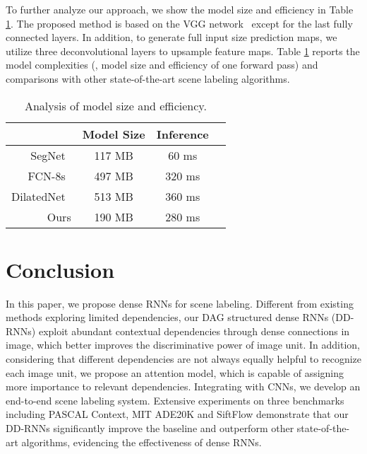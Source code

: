 \documentclass[10pt,twocolumn,letterpaper]{article}
\begin{document}
To further analyze our approach, we show the model size and efficiency in Table \ref{tab:tab5}. The proposed method is based on the VGG network~\cite{simonyan2014very} except for the last fully connected layers. In addition, to generate full input size prediction maps, we utilize three deconvolutional layers to upsample feature maps. Table \ref{tab:tab5} reports the model complexities (\ie, model size and efficiency of one forward pass) and comparisons with other state-of-the-art scene labeling algorithms.

\renewcommand\arraystretch{1}
\begin{table}[htbp]\small
  \centering
  \caption{Analysis of model size and efficiency.}
    \begin{tabular}{rccc}
    \hline
            & \multicolumn{1}{l}{Model Size}  & \multicolumn{1}{l}{Inference} \\
    \hline
    \hline
    SegNet~\cite{badrinarayanan2015segnet}  &    117 MB               &  60 ms\\
    FCN-8s~\cite{long2015fully}  &    497 MB                  &  320 ms\\
    DilatedNet~\cite{yu2015multi} &      513 MB                 &  360 ms\\
    \hline
    \hline
    Ours                           &     190 MB                 & 280 ms \\
    \hline
    \end{tabular}%
  \label{tab:tab5}%
\end{table}%

\section{Conclusion}
\label{sec_con}

In this paper, we propose dense RNNs for scene labeling. Different from existing methods exploring limited dependencies, our DAG structured dense RNNs (DD-RNNs) exploit abundant contextual dependencies through dense connections in image, which better improves the discriminative power of image unit. In addition, considering that different dependencies are not always equally helpful to recognize each image unit, we propose an attention model, which is capable of assigning more importance to relevant dependencies. Integrating with CNNs, we develop an end-to-end scene labeling system. Extensive experiments on three benchmarks including PASCAL Context, MIT ADE20K and SiftFlow demonstrate that our DD-RNNs significantly improve the baseline and outperform other state-of-the-art algorithms, evidencing the effectiveness of dense RNNs.

{\small


}
\end{document}
